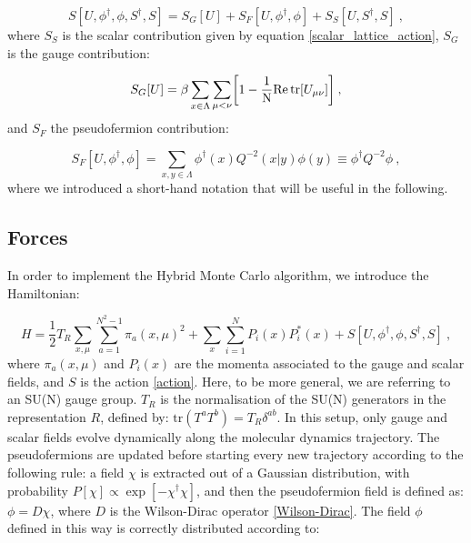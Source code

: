 \begin{equation}
S[U,\phi^{\dagger},\phi,S^{\dagger},S] = S_G[U] + S_F[U,\phi^{\dagger},\phi] + S_S[U,S^{\dagger},S] \: ,
\label{action}
\end{equation}
%
where $S_S$ is the scalar contribution given by equation \ref{scalar_lattice_action}, $S_G$ is the gauge contribution:

\begin{equation}
S_G[U] =  \beta \sum_{x \in \Lambda}  \sum_{\mu < \nu} \biggr[  1 - \frac{1}{\mathrm{N}} \mathrm{Re} \tr  [U_{\mu \nu}] \biggl ] \: ,
\end{equation}
%
and $S_F$ the pseudofermion contribution:

\begin{equation}
S_F[U,\phi^{\dagger},\phi]  = \sum_{x,y \in \Lambda} \phi^{\dagger}(x) Q^{-2}(x \vert y)\phi(y) \equiv \phi^{\dagger} Q^{-2} \phi \: ,
\end{equation}
%
where we introduced a short-hand notation that will be useful in the following.


\subsection{Forces}
\label{Forces}

In order to implement the Hybrid Monte Carlo algorithm, we introduce the Hamiltonian:

\begin{equation}
H = \frac{1}{2} T_R\sum_{x,\mu}\sum_{a=1}^{N^2-1} \pi_a (x, \mu)^2 + \sum_x \sum_{i=1}^N P_i(x)P^*_i(x) + S[U,\phi^{\dagger},\phi,S^{\dagger},S] \: ,
\end{equation}
%
where $\pi_a(x,\mu)$ and $P_i(x)$ are the momenta associated to the gauge and scalar fields, and $S$ is the action \ref{action}. Here, to be more general, we are referring to an SU(N) gauge group. $T_R$ is the normalisation of the SU(N) generators in the representation $R$, defined by: $\mathrm{tr} (T^aT^b) = T_R \delta^{ab}$.
In this setup, only gauge and scalar fields evolve dynamically along the molecular dynamics trajectory. The pseudofermions are updated before starting every new trajectory according to the following rule: a field $\chi$ is extracted out of a Gaussian distribution, with probability $P[\chi] \propto \exp [-\chi^{\dagger} \chi]$, and then the pseudofermion field is defined as: $\phi = D \chi$, where $D$ is the Wilson-Dirac operator \ref{Wilson-Dirac}. The field $\phi$ defined in this way is correctly distributed according to:



